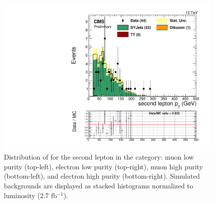 \begin{figure}[h]
\begin{center}
\includegraphics[scale=0.37]{figures/control/ptlep2EHP.pdf}
\caption[Distribution of \ptrans for the second lepton]{Distribution of \ptrans for the second lepton in the category: muon low purity (top-left), electron low purity (top-right), muon high purity (bottom-left), and  electron high purity (bottom-right). Simulated backgrounds are displayed as stacked histograms normalized to luminosity (2.7 fb$^{-1}$).}
\label{ptlep2_VZ}
\end{center}
\end{figure}

